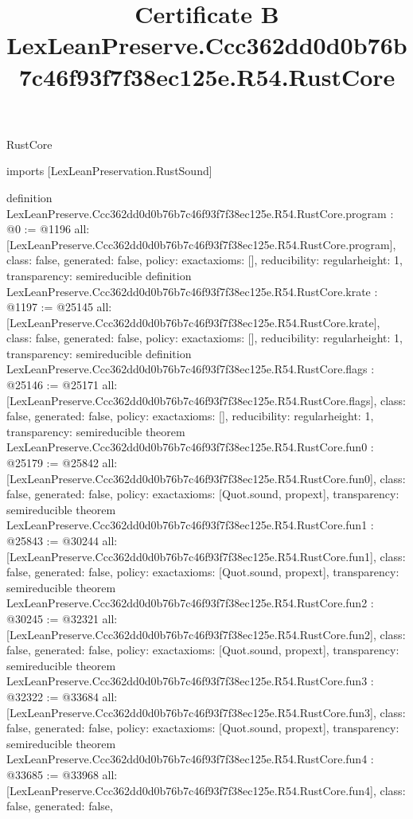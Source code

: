 \begin{lexlean}{RustCore}
\title{Certificate B LexLeanPreserve.Ccc362dd0d0b76b7c46f93f7f38ec125e.R54.RustCore}
\begin{coremodule}
imports [LexLeanPreservation.RustSound]

definition LexLeanPreserve.Ccc362dd0d0b76b7c46f93f7f38ec125e.R54.RustCore.program : @0 := @1196 {
  all: [LexLeanPreserve.Ccc362dd0d0b76b7c46f93f7f38ec125e.R54.RustCore.program],
  class: false,
  generated: false,
  policy: exact{axioms: []},
  reducibility: regular{height: 1},
  transparency: semireducible
}
definition LexLeanPreserve.Ccc362dd0d0b76b7c46f93f7f38ec125e.R54.RustCore.krate : @1197 := @25145 {
  all: [LexLeanPreserve.Ccc362dd0d0b76b7c46f93f7f38ec125e.R54.RustCore.krate],
  class: false,
  generated: false,
  policy: exact{axioms: []},
  reducibility: regular{height: 1},
  transparency: semireducible
}
definition LexLeanPreserve.Ccc362dd0d0b76b7c46f93f7f38ec125e.R54.RustCore.flags : @25146 := @25171 {
  all: [LexLeanPreserve.Ccc362dd0d0b76b7c46f93f7f38ec125e.R54.RustCore.flags],
  class: false,
  generated: false,
  policy: exact{axioms: []},
  reducibility: regular{height: 1},
  transparency: semireducible
}
theorem LexLeanPreserve.Ccc362dd0d0b76b7c46f93f7f38ec125e.R54.RustCore.fun0 : @25179 := @25842 {
  all: [LexLeanPreserve.Ccc362dd0d0b76b7c46f93f7f38ec125e.R54.RustCore.fun0],
  class: false,
  generated: false,
  policy: exact{axioms: [Quot.sound, propext]},
  transparency: semireducible
}
theorem LexLeanPreserve.Ccc362dd0d0b76b7c46f93f7f38ec125e.R54.RustCore.fun1 : @25843 := @30244 {
  all: [LexLeanPreserve.Ccc362dd0d0b76b7c46f93f7f38ec125e.R54.RustCore.fun1],
  class: false,
  generated: false,
  policy: exact{axioms: [Quot.sound, propext]},
  transparency: semireducible
}
theorem LexLeanPreserve.Ccc362dd0d0b76b7c46f93f7f38ec125e.R54.RustCore.fun2 : @30245 := @32321 {
  all: [LexLeanPreserve.Ccc362dd0d0b76b7c46f93f7f38ec125e.R54.RustCore.fun2],
  class: false,
  generated: false,
  policy: exact{axioms: [Quot.sound, propext]},
  transparency: semireducible
}
theorem LexLeanPreserve.Ccc362dd0d0b76b7c46f93f7f38ec125e.R54.RustCore.fun3 : @32322 := @33684 {
  all: [LexLeanPreserve.Ccc362dd0d0b76b7c46f93f7f38ec125e.R54.RustCore.fun3],
  class: false,
  generated: false,
  policy: exact{axioms: [Quot.sound, propext]},
  transparency: semireducible
}
theorem LexLeanPreserve.Ccc362dd0d0b76b7c46f93f7f38ec125e.R54.RustCore.fun4 : @33685 := @33968 {
  all: [LexLeanPreserve.Ccc362dd0d0b76b7c46f93f7f38ec125e.R54.RustCore.fun4],
  class: false,
  generated: false,
}
\end{coremodule}
\end{lexlean}
